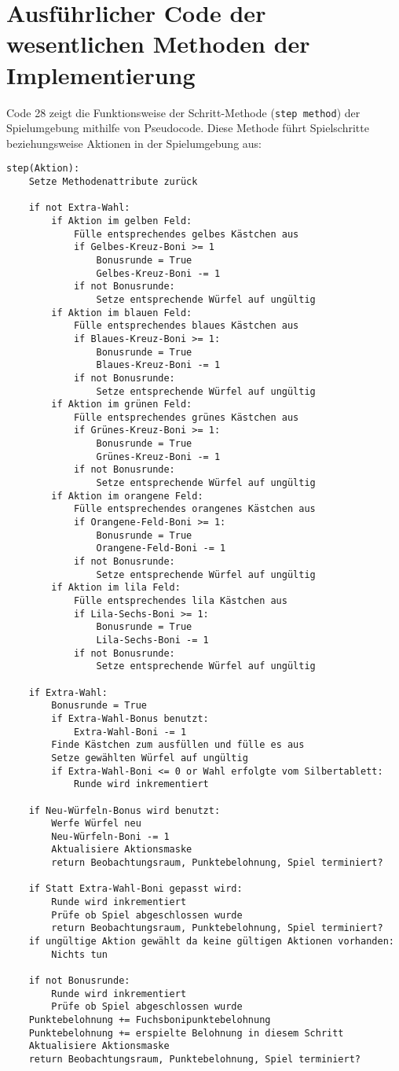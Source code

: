\section{Ausführlicher Code der wesentlichen Methoden der Implementierung}
Code 28 zeigt die Funktionsweise der Schritt-Methode (\texttt{step method}) der Spielumgebung mithilfe von Pseudocode. Diese Methode führt Spielschritte beziehungsweise Aktionen in der Spielumgebung aus:
\vspace{0.5cm}
\begin{lstlisting}[caption={Schritt-Methode},morekeywords={Aktion}]
step(Aktion):
	Setze Methodenattribute zurück
	
	if not Extra-Wahl:
		if Aktion im gelben Feld:
			Fülle entsprechendes gelbes Kästchen aus
			if Gelbes-Kreuz-Boni >= 1
				Bonusrunde = True
				Gelbes-Kreuz-Boni -= 1
			if not Bonusrunde:
				Setze entsprechende Würfel auf ungültig
		if Aktion im blauen Feld:
			Fülle entsprechendes blaues Kästchen aus
			if Blaues-Kreuz-Boni >= 1:
				Bonusrunde = True
				Blaues-Kreuz-Boni -= 1
			if not Bonusrunde:
				Setze entsprechende Würfel auf ungültig
		if Aktion im grünen Feld:
			Fülle entsprechendes grünes Kästchen aus
			if Grünes-Kreuz-Boni >= 1:
				Bonusrunde = True
				Grünes-Kreuz-Boni -= 1
			if not Bonusrunde:
				Setze entsprechende Würfel auf ungültig
		if Aktion im orangene Feld:
			Fülle entsprechendes orangenes Kästchen aus
			if Orangene-Feld-Boni >= 1:
				Bonusrunde = True
				Orangene-Feld-Boni -= 1
			if not Bonusrunde:
				Setze entsprechende Würfel auf ungültig
		if Aktion im lila Feld:
			Fülle entsprechendes lila Kästchen aus
			if Lila-Sechs-Boni >= 1:
				Bonusrunde = True
				Lila-Sechs-Boni -= 1
			if not Bonusrunde:
				Setze entsprechende Würfel auf ungültig
	
	if Extra-Wahl:
		Bonusrunde = True
		if Extra-Wahl-Bonus benutzt:
			Extra-Wahl-Boni -= 1
		Finde Kästchen zum ausfüllen und fülle es aus
		Setze gewählten Würfel auf ungültig
		if Extra-Wahl-Boni <= 0 or Wahl erfolgte vom Silbertablett:
			Runde wird inkrementiert
	
	if Neu-Würfeln-Bonus wird benutzt:
		Werfe Würfel neu
		Neu-Würfeln-Boni -= 1
		Aktualisiere Aktionsmaske
		return Beobachtungsraum, Punktebelohnung, Spiel terminiert?
	
	if Statt Extra-Wahl-Boni gepasst wird:
		Runde wird inkrementiert
		Prüfe ob Spiel abgeschlossen wurde
		return Beobachtungsraum, Punktebelohnung, Spiel terminiert?
	if ungültige Aktion gewählt da keine gültigen Aktionen vorhanden:
		Nichts tun
	
	if not Bonusrunde:
		Runde wird inkrementiert
		Prüfe ob Spiel abgeschlossen wurde
	Punktebelohnung += Fuchsbonipunktebelohnung
	Punktebelohnung += erspielte Belohnung in diesem Schritt
	Aktualisiere Aktionsmaske
	return Beobachtungsraum, Punktebelohnung, Spiel terminiert?		
\end{lstlisting}

